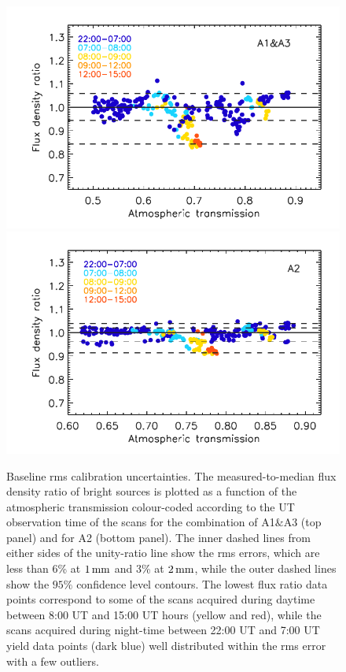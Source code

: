 \begin{figure}[!thbp]
  \begin{center}
      \includegraphics[clip=true, trim={0.9cm, 0, 0.5cm, 0.6cm},width=0.75\linewidth]{Figures/plot_flux_density_ratio_obstau_allbright_obsdate_corrected_skydip_rescaled_1mm.pdf}
     \includegraphics[clip=true, trim={0.9cm, 0, 0.5cm, 0.6cm},width=0.75\linewidth]{Figures/plot_flux_density_ratio_obstau_allbright_obsdate_corrected_skydip_rescaled_a2.pdf} 
    \caption[Baseline calibration rms error estimate]{Baseline
      rms calibration uncertainties. The
      measured-to-median flux density ratio of bright sources is
      plotted as a function of the atmospheric transmission
      colour-coded according to the UT
      observation time of the scans for the combination of A1$\&$A3
      (top panel)
      and for A2 (bottom panel).
      The inner dashed lines from either sides of the
      unity-ratio line show the rms errors, {\lp which
      are less than 6\% at $1\,\rm{mm}$ and 3\% at $2\,\rm{mm}$, while
      the outer dashed lines show the $95\%$ confidence level contours.}
      The lowest flux ratio data points correspond to some of the
      scans acquired during daytime between 8:00 UT and 15:00 UT
      hours (yellow and red), while the scans acquired during night-time
      between 22:00 UT and 7:00 UT yield data points (dark blue)
      well distributed within the rms error with a few outliers.}
    \label{fig:allbright_rms_corrected_skydip}
  \end{center}
\end{figure}
